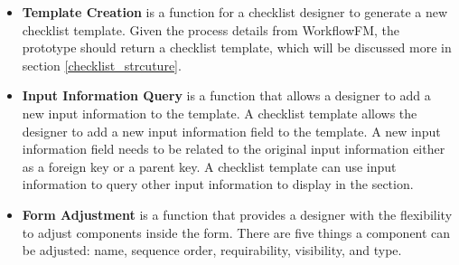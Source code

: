 \begin{itemize}
    \item \textbf{Template Creation} is a function for a checklist designer to generate a new checklist template. Given the process details from WorkflowFM, the prototype should return a checklist template, which will be discussed more in section \ref{checklist_strcuture}.
    \item \textbf{Input Information Query} is a function that allows a designer to add a new input information to the template. A checklist template allows the designer to add a new input information field to the template. A new input information field needs to be related to the original input information either as a foreign key or a parent key. A checklist template can use input information to query other input information to display in the section.
    \item \textbf{Form Adjustment} is a function that provides a designer with the flexibility to adjust components inside the form. There are five things a component can be adjusted: name, sequence order, requirability, visibility, and type.

\end{itemize}
